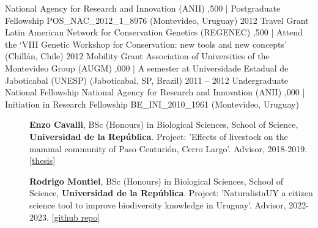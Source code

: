 \documentclass[9pt]{developercv} %
\begin{document}
\begin{entrylist}
		{National Agency for Research and Innovation (ANII)}
		{,500 | Postgraduate Fellowship POS\_NAC\_2012\_1\_8976 (Montevideo, Uruguay)}
	\entry
		{2012}
		{Travel Grant}
		{Latin American Network for Conservation Genetics (REGENEC)}
		{,500 | Attend the ‘VIII Genetic Workshop for Conservation: new tools and new concepts’ (Chillán, Chile)}
	\entry
		{2012}
		{Mobility Grant}
		{Association of Universities of the Montevideo Group (AUGM)}
		{,000 | A semester at Universidade Estadual de Jaboticabal (UNESP) (Jaboticabal, SP, Brazil)}
	\entry
		{2011 -- 2012}
		{Undergraduate National Fellowship}
		{National Agency for Research and Innovation (ANII)}
		{,000 | Initiation in Research Fellowship BE\_INI\_2010\_1961 (Montevideo, Uruguay)}

\end{entrylist}



\begin{description}
\item[]{\bf Enzo Cavalli}, BSc (Honours) in Biological Sciences, School of Science, {\bf Universidad de la Rep\'{u}blica}. Project: 'Effects of livestock on the mammal community of Paso Centurión, Cerro Largo'. Advisor, 2018-2019.  [\href{https://www.colibri.udelar.edu.uy/jspui/bitstream/20.500.12008/23484/6/uy24-19703.pdf}{thesis}]
\item[]{\bf Rodrigo Montiel}, BSc (Honours) in Biological Sciences, School of Science, {\bf Universidad de la Rep\'{u}blica}. Project: 'NaturalistaUY a citizen science tool to improve biodiversity knowledge in Uruguay'. Advisor, 2022-2023.  [\href{https://github.com/Rodrigo-Montiel/TesisNaturalistaUY}{github repo}]
\end{description}



\end{document}
